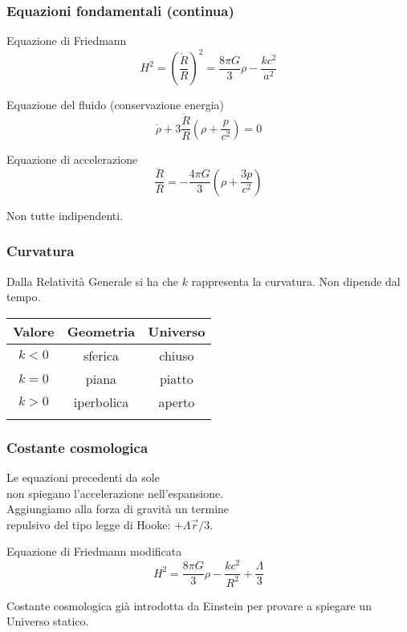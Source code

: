 \begin{frame}
  \frametitle{Equazioni fondamentali (continua)}
  \begin{block}{Equazione di Friedmann}
    \begin{equation*}
      H^2 = \left( \frac{\dot{R}}{R} \right)^2 = \frac{8\pi G}{3}\rho -
      \frac{kc^2}{a^2}
    \end{equation*}
  \end{block}
  \pause{}
  \begin{block}{Equazione del fluido (conservazione energia)}
    \begin{equation*}
      \dot{\rho} + 3\frac{\dot{R}}{R}\left( \rho + \frac{p}{c^2} \right) = 0
    \end{equation*}
  \end{block}
  \pause{}
  \begin{block}{Equazione di accelerazione}
    \begin{equation*}
    \frac{\ddot{R}}{R} = -\frac{4\pi G}{3}\left( \rho + \frac{3p}{c^2} \right)
  \end{equation*}
  \end{block}
  Non tutte indipendenti.
\end{frame}

\begin{frame}
  \frametitle{Curvatura}
  Dalla Relatività Generale si ha che $k$ rappresenta la curvatura. Non dipende
  dal tempo.
  \begin{table}
    \centering
    \begin{tabular}{ccc}
      \toprule{}
      Valore  & Geometria  & Universo \\
      \midrule{}
      $k < 0$ & sferica    & chiuso   \\
      $k = 0$ & piana      & piatto   \\
      $k > 0$ & iperbolica & aperto   \\
      \bottomrule{}
    \end{tabular}
  \end{table}
\end{frame}

\begin{frame}
  \frametitle{Costante cosmologica}
  Le equazioni precedenti da sole \\
  non spiegano l'accelerazione nell'espansione. \\
  Aggiungiamo alla forza di gravità un termine \\
  repulsivo del tipo legge di Hooke: $+\Lambda\vec{r}/3$.
  \begin{block}{Equazione di Friedmann modificata}
    \begin{equation*}
      H^2 = \frac{8\pi G}{3}\rho - \frac{kc^2}{R^2} + \frac{\Lambda}{3}
    \end{equation*}
  \end{block}
  Costante cosmologica già introdotta da Einstein per provare a spiegare un
  Universo statico.
\end{frame}

